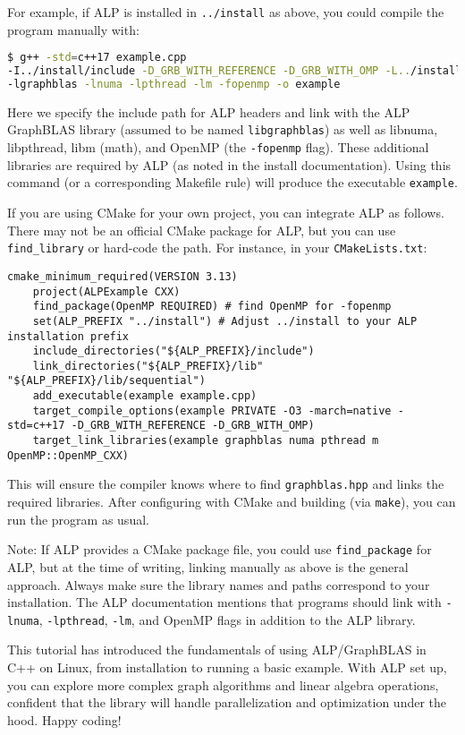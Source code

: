 For example, if ALP is installed in \texttt{../install} as above, you could compile the program manually with:
\begin{lstlisting}[language=bash]
$ g++ -std=c++17 example.cpp
-I../install/include -D_GRB_WITH_REFERENCE -D_GRB_WITH_OMP -L../install/lib/sequential
-lgraphblas -lnuma -lpthread -lm -fopenmp -o example
\end{lstlisting}
Here we specify the include path for ALP headers and link with the ALP GraphBLAS library (assumed to be named \texttt{libgraphblas}) as well as libnuma, libpthread, libm (math), and OpenMP (the \texttt{-fopenmp} flag). These additional libraries are required by ALP (as noted in the install documentation). Using this command (or a corresponding Makefile rule) will produce the executable \texttt{example}.

If you are using CMake for your own project, you can integrate ALP as follows. There may not be an official CMake package for ALP, but you can use \texttt{find\_library} or hard-code the path. For instance, in your \texttt{CMakeLists.txt}:

\begin{lstlisting}[caption={Example CMakeLists.txt for an ALP project}]
    cmake_minimum_required(VERSION 3.13)
    project(ALPExample CXX)
    find_package(OpenMP REQUIRED) # find OpenMP for -fopenmp
    set(ALP_PREFIX "../install") # Adjust ../install to your ALP installation prefix
    include_directories("${ALP_PREFIX}/include")
    link_directories("${ALP_PREFIX}/lib" "${ALP_PREFIX}/lib/sequential")
    add_executable(example example.cpp)
    target_compile_options(example PRIVATE -O3 -march=native -std=c++17 -D_GRB_WITH_REFERENCE -D_GRB_WITH_OMP)
    target_link_libraries(example graphblas numa pthread m OpenMP::OpenMP_CXX)
\end{lstlisting}

This will ensure the compiler knows where to find \texttt{graphblas.hpp} and links the required libraries. After configuring with CMake and building (via \texttt{make}), you can run the program as usual.

\vspace{1ex}

Note: If ALP provides a CMake package file, you could use \texttt{find\_package} for ALP, but at the time of writing, linking manually as above is the general approach. Always make sure the library names and paths correspond to your installation. The ALP documentation mentions that programs should link with \texttt{-lnuma}, \texttt{-lpthread}, \texttt{-lm}, and OpenMP flags in addition to the ALP library.

\bigskip

This tutorial has introduced the fundamentals of using ALP/GraphBLAS in C++ on Linux, from installation to running a basic example. With ALP set up, you can explore more complex graph algorithms and linear algebra operations, confident that the library will handle parallelization and optimization under the hood. Happy coding!
